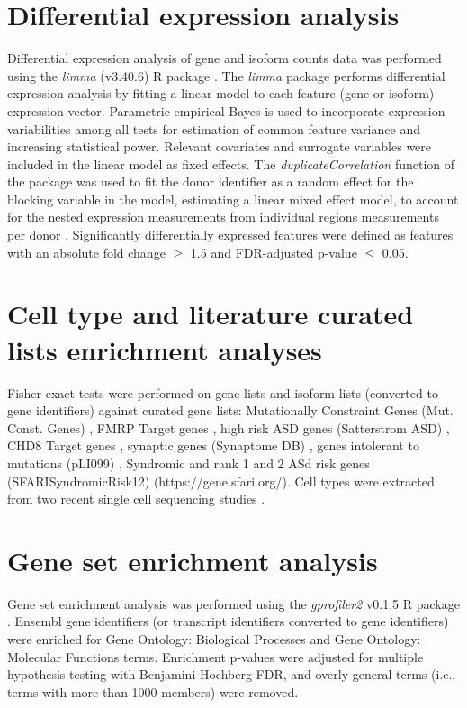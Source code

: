 \documentclass[12pt,chapterheads,final]{ucsd}
\begin{document}
\section{Differential expression analysis}
Differential expression analysis of gene and isoform counts data was performed using the \textit{limma} (v3.40.6) R package \cite{Ritchie2015}. The \textit{limma} package performs differential expression analysis by fitting a linear model to each feature (gene or isoform) expression vector. Parametric empirical Bayes is used to incorporate expression variabilities among all tests for estimation of common feature variance and increasing statistical power. Relevant covariates and surrogate variables were included in the linear model as fixed effects. The \textit{duplicateCorrelation} function of the package was used to fit the donor identifier as a random effect for the blocking variable in the model, estimating a linear mixed effect model, to account for the nested expression measurements from individual regions measurements per donor \cite{Ritchie2015}. Significantly differentially expressed features were defined as features with an absolute fold change $\geq$ 1.5 and FDR-adjusted p-value $\leq$ 0.05.

\section{Cell type and literature curated lists enrichment analyses}
Fisher-exact tests were performed on gene lists and isoform lists (converted to gene identifiers) against curated gene lists: Mutationally Constraint Genes (Mut. Const. Genes) \cite{Samocha2014}, FMRP Target genes \cite{Darnell2011}, high risk ASD genes (Satterstrom ASD) \cite{Satterstrom2019}, CHD8 Target genes \cite{Wilkinson2015}, synaptic genes (Synaptome DB) \cite{Pirooznia2012}, genes intolerant to mutations (pLI099) \cite{Lek2016}, Syndromic and rank 1 and 2 ASd risk genes (SFARISyndromicRisk12) (https://gene.sfari.org/). Cell types were extracted from two recent single cell sequencing studies \cite{Wang2018,Zhong2018}.

\section{Gene set enrichment analysis}
Gene set enrichment analysis was performed using the \textit{gprofiler2} v0.1.5 R package \cite{Raudvere2019}. Ensembl gene identifiers (or transcript identifiers converted to gene identifiers) were enriched for Gene Ontology: Biological Processes and Gene Ontology: Molecular Functions terms. Enrichment p-values were adjusted for multiple hypothesis testing with Benjamini-Hochberg FDR, and overly general terms (i.e., terms with more than 1000 members) were removed.
\end{document}

